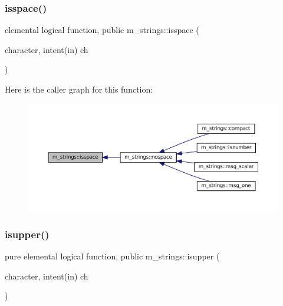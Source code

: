 \mbox{\label{namespacem__strings_ab32380c29451e56395153155c1632d74}} 
\subsubsection{\texorpdfstring{isspace()}{isspace()}}
{\footnotesize\ttfamily elemental logical function, public m\+\_\+strings\+::isspace (\begin{DoxyParamCaption}\item[{character, intent(in)}]{ch }\end{DoxyParamCaption})}

Here is the caller graph for this function\+:
\nopagebreak
\begin{figure}[H]
\begin{center}
\leavevmode
\includegraphics[width=350pt]{namespacem__strings_ab32380c29451e56395153155c1632d74_icgraph}
\end{center}
\end{figure}
\mbox{\label{namespacem__strings_ac98536a1b69026cd5373dfff489f7733}} 
\subsubsection{\texorpdfstring{isupper()}{isupper()}}
{\footnotesize\ttfamily pure elemental logical function, public m\+\_\+strings\+::isupper (\begin{DoxyParamCaption}\item[{character, intent(in)}]{ch }\end{DoxyParamCaption})}

\mbox{\label{namespacem__strings_a9953d1e400bedceab6a06910c6cdf208}} 
